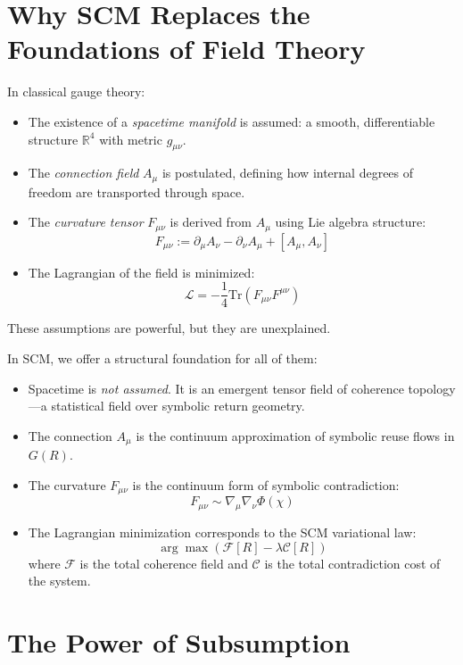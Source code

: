 \section{Why SCM Replaces the Foundations of Field Theory}

In classical gauge theory:

\begin{itemize}
    \item The existence of a \emph{spacetime manifold} is assumed: a smooth, differentiable structure $\mathbb{R}^4$ with metric $g_{\mu\nu}$.
    \item The \emph{connection field} $A_\mu$ is postulated, defining how internal degrees of freedom are transported through space.
    \item The \emph{curvature tensor} $F_{\mu\nu}$ is derived from $A_\mu$ using Lie algebra structure:
    \[
    F_{\mu\nu} := \partial_\mu A_\nu - \partial_\nu A_\mu + [A_\mu, A_\nu]
    \]
    \item The Lagrangian of the field is minimized:
    \[
    \mathcal{L} = -\frac{1}{4} \text{Tr}(F_{\mu\nu}F^{\mu\nu})
    \]
\end{itemize}

These assumptions are powerful, but they are unexplained.

In SCM, we offer a structural foundation for all of them:

\begin{itemize}
    \item Spacetime is \emph{not assumed}. It is an emergent tensor field of coherence topology---a statistical field over symbolic return geometry.
    \item The connection $A_\mu$ is the continuum approximation of symbolic reuse flows in $G(R)$.
    \item The curvature $F_{\mu\nu}$ is the continuum form of symbolic contradiction:
    \[
    F_{\mu\nu} \sim \nabla_\mu \nabla_\nu \Phi(\chi)
    \]
    \item The Lagrangian minimization corresponds to the SCM variational law:
    \[
    \arg \max \left( \mathcal{F}[R] - \lambda \mathcal{C}[R] \right)
    \]
    where $\mathcal{F}$ is the total coherence field and $\mathcal{C}$ is the total contradiction cost of the system.
\end{itemize}

\section{The Power of Subsumption}

